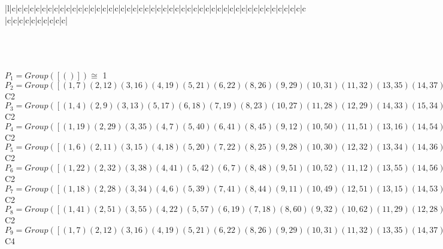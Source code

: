 \documentclass[varwidth=\maxdimen,border=10]{standalone}
\begin{document}
\begin{tabular}
\begin{array}{|l|c|c|c|c|c|c|c|c|c|c|c|c|c|c|c|c|c|c|c|c|c|c|c|c|c|c|c|c|c|c|c|c|c|c|c|c|c|c|c|c|c|c|c|c|c|c|c|c|c|c|c|c|c|c|c|c|c|c|c|}
\end{array}\)\\
\ \\
\ \\
$P_{1} = Group( [ () ] )\cong$ 1\ \\
$P_{2} = Group( [ ( 1, 7)( 2,12)( 3,16)( 4,19)( 5,21)( 6,22)( 8,26)( 9,29)(10,31)(11,32)(13,35)(14,37)(15,38)(17,40)(18,41)(20,42)(23,45)(24,47)(25,48)(27,50)(28,51)(30,52)(33,54)(34,55)(36,56)(39,57)(43,59)(44,60)(46,61)(49,62)(53,63)(58,64) ] )\cong$ C2\ \\
$P_{3} = Group( [ ( 1, 4)( 2, 9)( 3,13)( 5,17)( 6,18)( 7,19)( 8,23)(10,27)(11,28)(12,29)(14,33)(15,34)(16,35)(20,39)(21,40)(22,41)(24,43)(25,44)(26,45)(30,49)(31,50)(32,51)(36,53)(37,54)(38,55)(42,57)(46,58)(47,59)(48,60)(52,62)(56,63)(61,64) ] )\cong$ C2\ \\
$P_{4} = Group( [ ( 1,19)( 2,29)( 3,35)( 4, 7)( 5,40)( 6,41)( 8,45)( 9,12)(10,50)(11,51)(13,16)(14,54)(15,55)(17,21)(18,22)(20,57)(23,26)(24,59)(25,60)(27,31)(28,32)(30,62)(33,37)(34,38)(36,63)(39,42)(43,47)(44,48)(46,64)(49,52)(53,56)(58,61) ] )\cong$ C2\ \\
$P_{5} = Group( [ ( 1, 6)( 2,11)( 3,15)( 4,18)( 5,20)( 7,22)( 8,25)( 9,28)(10,30)(12,32)(13,34)(14,36)(16,38)(17,39)(19,41)(21,42)(23,44)(24,46)(26,48)(27,49)(29,51)(31,52)(33,53)(35,55)(37,56)(40,57)(43,58)(45,60)(47,61)(50,62)(54,63)(59,64) ] )\cong$ C2\ \\
$P_{6} = Group( [ ( 1,22)( 2,32)( 3,38)( 4,41)( 5,42)( 6, 7)( 8,48)( 9,51)(10,52)(11,12)(13,55)(14,56)(15,16)(17,57)(18,19)(20,21)(23,60)(24,61)(25,26)(27,62)(28,29)(30,31)(33,63)(34,35)(36,37)(39,40)(43,64)(44,45)(46,47)(49,50)(53,54)(58,59) ] )\cong$ C2\ \\
$P_{7} = Group( [ ( 1,18)( 2,28)( 3,34)( 4, 6)( 5,39)( 7,41)( 8,44)( 9,11)(10,49)(12,51)(13,15)(14,53)(16,55)(17,20)(19,22)(21,57)(23,25)(24,58)(26,60)(27,30)(29,32)(31,62)(33,36)(35,38)(37,63)(40,42)(43,46)(45,48)(47,64)(50,52)(54,56)(59,61) ] )\cong$ C2\ \\
$P_{8} = Group( [ ( 1,41)( 2,51)( 3,55)( 4,22)( 5,57)( 6,19)( 7,18)( 8,60)( 9,32)(10,62)(11,29)(12,28)(13,38)(14,63)(15,35)(16,34)(17,42)(20,40)(21,39)(23,48)(24,64)(25,45)(26,44)(27,52)(30,50)(31,49)(33,56)(36,54)(37,53)(43,61)(46,59)(47,58) ] )\cong$ C2\ \\
$P_{9} = Group( [ ( 1, 7)( 2,12)( 3,16)( 4,19)( 5,21)( 6,22)( 8,26)( 9,29)(10,31)(11,32)(13,35)(14,37)(15,38)(17,40)(18,41)(20,42)(23,45)(24,47)(25,48)(27,50)(28,51)(30,52)(33,54)(34,55)(36,56)(39,57)(43,59)(44,60)(46,61)(49,62)(53,63)(58,64), ( 1, 5, 7,21)( 2,10,12,31)( 3,14,16,37)( 4,17,19,40)( 6,20,22,42)( 8,24,26,47)( 9,27,29,50)(11,30,32,52)(13,33,35,54)(15,36,38,56)(18,39,41,57)(23,43,45,59)(25,46,48,61)(28,49,51,62)(34,53,55,63)(44,58,60,64) ] )\cong$ C4\ \\

\end{tabular}
\end{document}
